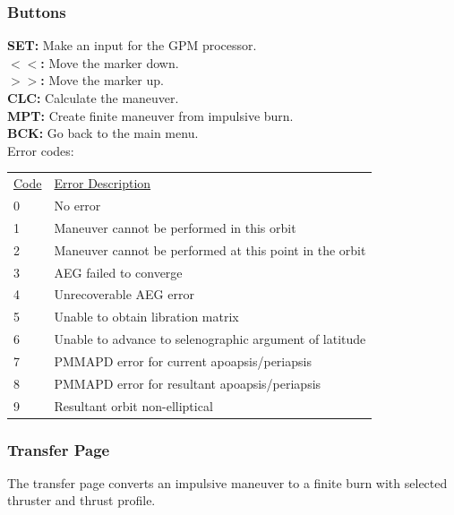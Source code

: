 \documentclass[11pt]{article} %
\begin{document}
\subsubsection{Buttons}

\textbf{SET:} Make an input for the GPM processor.\\
\textbf{$<<$:} Move the marker down.\\  
\textbf{$>>$:} Move the marker up.\\
\textbf{CLC:} Calculate the maneuver.\\
\textbf{MPT:} Create finite maneuver from impulsive burn.\\
\textbf{BCK:} Go back to the main menu.\\

Error codes:\\

\begin{tabular}{p{3cm} p{10cm}}
\underline{Code}&\underline{Error Description}\\
0&No error\\
1&Maneuver cannot be performed in this orbit\\
2&Maneuver cannot be performed at this point in the orbit\\
3&AEG failed to converge\\
4&Unrecoverable AEG error\\
5&Unable to obtain libration matrix\\
6&Unable to advance to selenographic argument of latitude\\
7&PMMAPD error for current apoapsis/periapsis\\
8&PMMAPD error for resultant apoapsis/periapsis\\ 
9&Resultant orbit non-elliptical\\
\end{tabular}
\newpage
\subsubsection{Transfer Page} 

The transfer page converts an impulsive maneuver to a finite burn with selected thruster and thrust profile.\\
\end{document}
